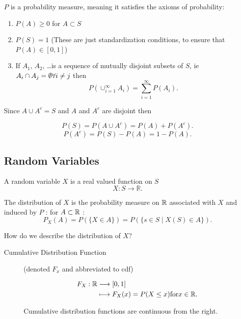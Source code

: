
$P$ is a probability measure, meaning it satisfies the axioms of probability:

\begin{enumerate}
	\item $P(A) \ge 0$ for $A \subset S$ 
	\item $P(S) = 1$ (These are just standardization conditions, to ensure that $P(A) \in [0,1]$)
	\item If $A_{1}$, $A_{2}$, \ldots is a sequence of mutually disjoint subsets of $S$, ie $A_{i} \cap  A_{j} =  \emptyset  \forall   i \neq j$ then
		\[
			P(\cup _{i=1}^\infty A_{i}) = \sum_{i=1}^{\infty} P(A_{i})
		.\] 

\end{enumerate}

Since $A \cup A ^{c} = S$ and $A$ and $A ^{c}$ are disjoint then 

\[
	P(S) = P(A \cup A ^{c}) = P(A) + P(A ^{c})
.\] \[
P(A^{c}) = P(S) - P(A) = 1 - P(A)
.\] 

\subsection{Random Variables}

A random variable $X$ is a real valued function on $ S$
\[
X : S \to \mathbb{R}
.\] 

\begin{definition}
	The distribution of $X$ is the probability measure on $\mathbb{R}$ associated with $X$ and induced by $P$ : for $A \subset \mathbb{R}$ :
	\[
		P_{X}(A) = P(\{X \in A\}) = P(\{s \in  S  \mid X(S) \in  A\})
	.\] 

\end{definition}
How do we describe the distribution of $ X$?

\begin{description}
	\item [Cumulative Distribution Function] (denoted $F_{x}$ and abbreviated to cdf)

	\begin{align*}
		F_{X}: \mathbb{R} &\longrightarrow [0,1] \\
		&\longmapsto F_{X}(x) = P(X\le x) \text{for}	x \in  \mathbb{R}
	.\end{align*}	

	Cumulative distribution functions are continuous from the right. 
\end{description}


